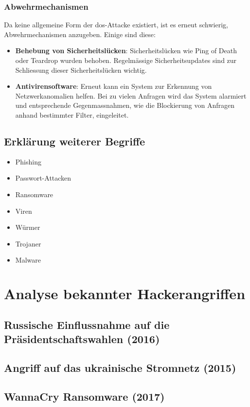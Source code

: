 \documentclass[11pt, a4paper]{article}
\begin{document}
\subsubsection{Abwehrmechanismen}
Da keine allgemeine Form der \gls{dos}-Attacke existiert, ist es erneut schwierig, Abwehrmechanismen anzugeben. Einige sind diese:

\begin{itemize}
	\item \textbf{Behebung von Sicherheitslücken}: Sicherheitslücken wie Ping of Death oder Teardrop wurden behoben. Regelmässige Sicherheitsupdates sind zur Schliessung dieser Sicherheitslücken wichtig.
	\item \textbf{Antivirensoftware}: Erneut kann ein System zur Erkennung von Netzwerkanomalien helfen. Bei zu vielen Anfragen wird das System alarmiert und entsprechende Gegenmassnahmen, wie die Blockierung von Anfragen anhand bestimmter Filter, eingeleitet.
\end{itemize}


\subsection{Erklärung weiterer Begriffe}
\begin{itemize}
	\item Phishing
	\item Passwort-Attacken
	\item Ransomware
	\item Viren
	\item Würmer
	\item Trojaner
	\item Malware
\end{itemize}


\section{Analyse bekannter Hackerangriffen}

\subsection{Russische Einflussnahme auf die Präsidentschaftswahlen (2016)}

\subsection{Angriff auf das ukrainische Stromnetz (2015)}

\subsection{WannaCry Ransomware (2017)}
\end{document}
